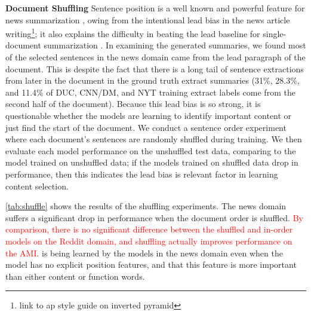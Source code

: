 \textbf{Document Shuffling} Sentence position is a well known and 
powerful feature for news summarization \cite{hong2014improving}, owing 
from the intentional lead bias in the news article writing\footnote{link to ap style guide on inverted pyramid}; it also explains the difficulty in beating
the lead baseline for single-document summarization 
\cite{nenkova2005automatic,rau:1999}.
In examining the generated summaries, we found
most of the selected sentences in the news domain came from the lead paragraph
of the document. This is despite the fact that there is a long tail of 
sentence extractions from later in the document in the ground truth extract 
summaries (31\%, 28.3\%, and 11.4\% of DUC, CNN/DM, and NYT training extract labels come 
from the second half of the document). 
Because this lead bias is so strong, it is questionable whether
the models are learning to identify important content or just find the start
of the document. We conduct a sentence order experiment where 
each document's sentences are randomly shuffled during training. We then
evaluate each model performance on the unshuffled test data, comparing to 
the model trained on unshuffled data; if the models trained on shuffled data
drop in performance, then this indicates the lead bias is relevant factor
in learning content selection.

\autoref{tab:shuffle} shows the results
of the shuffling experiments. 
The news domain suffers a significant drop in performance 
when the document order is shuffled. \textcolor{red}{By comparison, there is no significant difference between the shuffled and in-order models on 
the Reddit domain, and shuffling actually improves performance on the AMI}.
is being learned by the models in the news domain even when the model 
has no explicit position features, and that this feature is more important 
than either content or function words.





%


